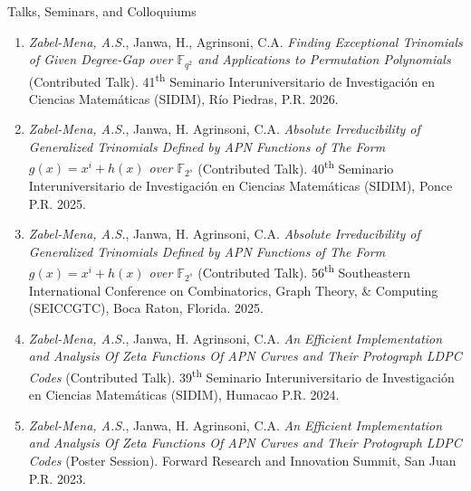 \documentclass{resume}
\begin{document}
\begin{rSection}{Talks, Seminars, and Colloquiums}
  \begin{enumerate}

    \item \textit{Zabel-Mena, A.S.}, Janwa, H., Agrinsoni, C.A.
      \textit{Finding Exceptional Trinomials of Given Degree-Gap
        over $\mathbb{F}_{q^2}$ and Applications to Permutation
      Polynomials} (Contributed Talk).
      41\textsuperscript{th}  Seminario Interuniversitario de
      Investigaci\'on en Ciencias Matem\'aticas (SIDIM), R\'io
      Piedras, P.R. 2026.

    \item \textit{Zabel-Mena, A.S.}, Janwa, H. Agrinsoni, C.A.
      \textit{Absolute Irreducibility of Generalized
        Trinomials Defined by APN Functions of The Form
      $g(x)=x^{i}+h(x)$ over $\mathbb{F}_{2^s}$} (Contributed Talk).
      40\textsuperscript{th} Seminario Interuniversitario de
      Investigaci\'on en Ciencias Matem\'aticas (SIDIM), Ponce P.R.
      2025.

    \item \textit{Zabel-Mena, A.S.}, Janwa, H. Agrinsoni, C.A.
      \textit{Absolute Irreducibility of Generalized
        Trinomials Defined by APN Functions of The Form
      $g(x)=x^{i}+h(x)$ over $\mathbb{F}_{2^s}$} (Contributed Talk).
      56\textsuperscript{th} Southeastern International Conference
      on Combinatorics, Graph Theory, \& Computing (SEICCGTC), Boca
      Raton, Florida. 2025.

    \item \textit{Zabel-Mena, A.S.}, Janwa, H. Agrinsoni, C.A.
      \textit{An Efficient Implementation and Analysis Of Zeta
      Functions Of APN Curves and Their Protograph LDPC Codes}
      (Contributed Talk). 39\textsuperscript{th} Seminario
      Interuniversitario de Investigaci\'on en Ciencias Matem\'aticas
      (SIDIM), Humacao P.R. 2024.

    \item \textit{Zabel-Mena, A.S.}, Janwa, H. Agrinsoni, C.A.
      \textit{An Efficient Implementation and Analysis Of Zeta
      Functions Of APN Curves and Their Protograph LDPC Codes}
      (Poster Session). Forward Research and Innovation Summit, San
      Juan P.R. 2023.
  \end{enumerate}
\end{rSection}

\pagebreak
\end{document}

